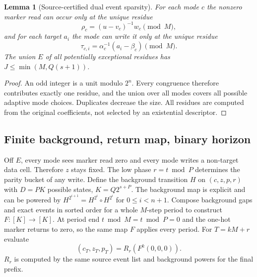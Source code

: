\documentclass[11pt]{article}
\newtheorem{lemma}{Lemma}
\begin{document}
\begin{lemma}[Source-certified dual event sparsity]
For each mode $c$ the nonzero marker read can occur only at the unique residue
\[
\rho_c=(u-v_c)^{-1}w_c\pmod M,
\]
and for each target $a_i$ the mode can write it only at the unique residue
\[
\tau_{c,i}=\alpha_c^{-1}(a_i-\beta_c)\pmod M.
\]
The union $E$ of all potentially exceptional residues has $J\le\min(M,Q(s+1))$.
\end{lemma}
\begin{proof}
An odd integer is a unit modulo $2^n$. Every congruence therefore contributes exactly one residue, and the union over all modes covers all possible adaptive mode choices. Duplicates decrease the size. All residues are computed from the original coefficients, not selected by an existential descriptor.
\end{proof}

\subsection{Finite background, return map, binary horizon}
Off $E$, every mode sees marker read zero and every mode writes a non-target data cell. Therefore $z$ stays fixed. The low phase $r=t\bmod P$ determines the parity bucket of any write. Define the background transition $H$ on $(c,z,p,r)$ with $D=PK$ possible states, $K=Q2^{s+P}$. The background map is explicit and can be powered by $H^{2^{i+1}}=H^{2^i}\circ H^{2^i}$ for $0\le i<n+1$. Compose background gaps and exact events in sorted order for a whole $M$-step period to construct $F:[K]\to[K]$. At period end $t\bmod M=t\bmod P=0$ and the one-hot marker returns to zero, so the same map $F$ applies every period. For $T=kM+r$ evaluate
\[
(c_T,z_T,p_T)=R_r(F^k(0,0,0)).
\]
$R_r$ is computed by the same source event list and background powers for the final prefix.
\end{document}
